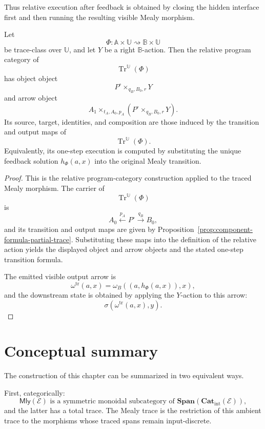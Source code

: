 Thus relative execution after feedback is obtained by closing the hidden
interface first and then running the resulting visible Mealy morphism.

\begin{proposition}
\label{prop:relative-execution-after-feedback}
Let
\[
\Phi:
\mathbb A\times\mathbb U
\rightsquigarrow
\mathbb B\times\mathbb U
\]
be trace-class over \(\mathbb U\), and let \(Y\) be a right
\(\mathbb B\)-action.  Then the relative program category of
\[
\operatorname{Tr}^{\mathbb U}(\Phi)
\]
has object object
\[
P^\circ\times_{q_B,B_0,r}Y
\]
and arrow object
\[
A_1\times_{t_A,A_0,p_A}
\left(P^\circ\times_{q_B,B_0,r}Y\right).
\]
Its source, target, identities, and composition are those induced by the
transition and output maps of
\[
\operatorname{Tr}^{\mathbb U}(\Phi).
\]
Equivalently, its one-step execution is computed by substituting the unique
feedback solution \(h_\Phi(a,x)\) into the original Mealy transition.
\end{proposition}

\begin{proof}
This is the relative program-category construction applied to the traced Mealy
morphism.  The carrier of
\[
\operatorname{Tr}^{\mathbb U}(\Phi)
\]
is
\[
A_0\xleftarrow{p_A}P^\circ\xrightarrow{q_B}B_0,
\]
and its transition and output maps are given by
Proposition~\ref{prop:component-formula-partial-trace}.  Substituting these
maps into the definition of the relative action yields the displayed object
and arrow objects and the stated one-step transition formula.

The emitted visible output arrow is
\[
\omega^{\operatorname{tr}}(a,x)
=
\omega_B((a,h_\Phi(a,x)),x),
\]
and the downstream state is obtained by applying the \(Y\)-action to this
arrow:
\[
\sigma(\omega^{\operatorname{tr}}(a,x),y).
\]
\end{proof}

\section{Conceptual summary}
\label{sec:partial-trace-conceptual-summary}

The construction of this chapter can be summarized in two equivalent ways.

First, categorically:
\[
\boxed{
\mathsf{Mly}(\mathcal E)
\text{ is a symmetric monoidal subcategory of }
\mathbf{Span}(\mathbf{Cat}_{\mathrm{int}}(\mathcal E)),
}
\]
and the latter has a total trace.  The Mealy trace is the restriction of this
ambient trace to the morphisms whose traced spans remain input-discrete.

